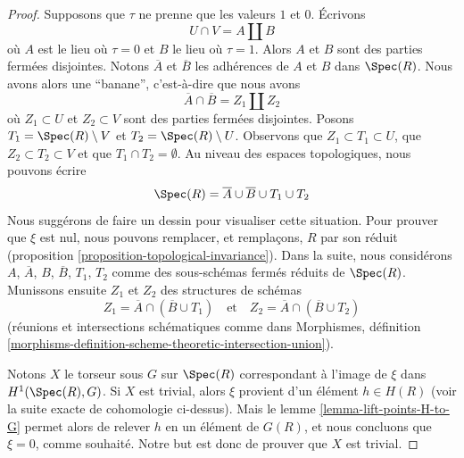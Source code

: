 \begin{proof}
\medskip\noindent
Supposons que $\tau$ ne prenne que les valeurs $1$ et $0$. Écrivons
$$
U \cap V = A \amalg B
$$
où $A$ est le lieu où $\tau = 0$ et $B$ le lieu
où $\tau = 1$. Alors $A$ et $B$ sont des parties fermées disjointes.
Notons $\overline{A}$ et $\overline{B}$ les adhérences de $A$ et $B$ dans
$\Spec(R)$. Nous avons alors une ``banane'', c'est-à-dire
que nous avons
$$
\overline{A} \cap \overline{B} = Z_1 \amalg Z_2
$$
où $Z_1 \subset U$ et $Z_2 \subset V$ sont des parties fermées disjointes.
Posons $T_1 = \Spec(R) \setminus V$ et $T_2 = \Spec(R) \setminus U$.
Observons que $Z_1 \subset T_1 \subset U$, que $Z_2 \subset T_2 \subset V$ et que
$T_1 \cap T_2 = \emptyset$. Au niveau des espaces topologiques, nous pouvons écrire
$$
\Spec(R) = \overline{A} \cup \overline{B} \cup T_1 \cup T_2
$$
Nous suggérons de faire un dessin pour visualiser cette situation.
Pour prouver que $\xi$ est nul, nous pouvons remplacer, et remplaçons, $R$ par
son réduit (proposition \ref{proposition-topological-invariance}).
Dans la suite, nous considérons $A$, $\overline{A}$, $B$, $\overline{B}$, $T_1$, $T_2$
comme des sous-schémas fermés réduits de $\Spec(R)$. Munissons ensuite $Z_1$
et $Z_2$ des structures de schémas
$$
Z_1 = \overline{A} \cap (\overline{B} \cup T_1)
\quad\text{et}\quad
Z_2 = \overline{A} \cap (\overline{B} \cup T_2)
$$
(réunions et intersections schématiques comme dans Morphismes, définition
\ref{morphisms-definition-scheme-theoretic-intersection-union}).

\medskip\noindent
Notons $X$ le torseur sous $G$ sur $\Spec(R)$ correspondant à l'image
de $\xi$ dans $H^1(\Spec(R), G)$. Si $X$ est trivial, alors $\xi$
provient d'un élément $h \in H(R)$ (voir la suite exacte de cohomologie
ci-dessus). Mais le lemme \ref{lemma-lift-points-H-to-G} permet alors
de relever $h$ en un élément de $G(R)$, et nous concluons
que $\xi = 0$, comme souhaité. Notre but est donc de prouver que $X$ est trivial.


\end{proof}
